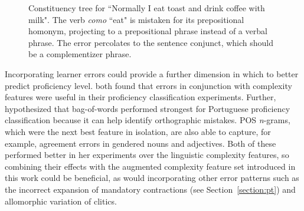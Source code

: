 \begin{figure}%
\centering
    \caption{Constituency tree for ``Normally I eat toast and drink coffee with milk". The verb \textit{como} ``eat" is mistaken for its prepositional homonym, projecting to a prepositional phrase instead of a verbal phrase. The error percolates to the sentence conjunct, which should be a complementizer phrase.}
    \label{fig:tree}
\end{figure}

Incorporating learner errors could provide a further dimension in which to better predict proficiency level.  both found that errors in conjunction with complexity features were useful in their proficiency classification experiments. Further, \citet{delrio2019a} hypothesized that bag-of-words performed strongest for Portuguese proficiency classification because it can help identify orthographic mistakes. POS \textit{n}-grams, which were the next best feature in isolation, are also able to capture, for example, agreement errors in gendered nouns and adjectives. Both of these performed better in her experiments over the linguistic complexity features, so combining their effects with the augmented complexity feature set introduced in this work could be beneficial, as would incorporating other error patterns such as the incorrect expansion of mandatory contractions (see Section~\ref{section:pt}) and allomorphic variation of clitics.

